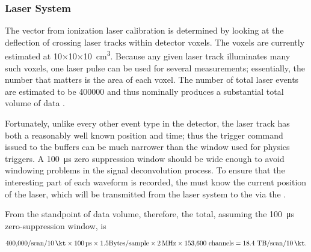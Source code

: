 \subsubsection{Laser System}

The \efield vector from ionization laser calibration is determined by looking at the deflection of crossing laser tracks within detector voxels. The voxels are currently estimated at \num{10}$\times$\num{10}$\times$\SI{10}{\cubic\cm}. Because any given laser track
illuminates many such voxels, one laser pulse can be used for several
measurements; essentially, the number that matters is the area of each voxel.
The number of total laser events are estimated to be \num{400000}
and thus nominally produces a substantial total volume of data .

Fortunately, unlike every other event type in the detector, the laser track has both a reasonably well known position and time; thus the trigger command issued to the  buffers can be much narrower than the window used for physics triggers. A \SI{100}{\micro\s} zero suppression window should be wide enough to avoid windowing problems in the 
signal deconvolution process. To ensure that the interesting part of each waveform is recorded, the  must know the current position  of the laser, which will be transmitted from the laser system to the  via the .


From the standpoint of data volume, therefore, the total, assuming the \SI{100}{\micro\s} zero-suppression window, is


\begin{equation}
\num{400000}/{\rm scan}/\SI{10}{\kt} \times \SI{100}{\micro\s} \times \num{1.5}{\rm Bytes/sample}\times \SI{2}{\mega\hertz}\times \dpnumcrpch~{\rm channels}   = \num{18.4}~{\rm TB/scan/\SI{10}{\kt}.}   
\end{equation}


